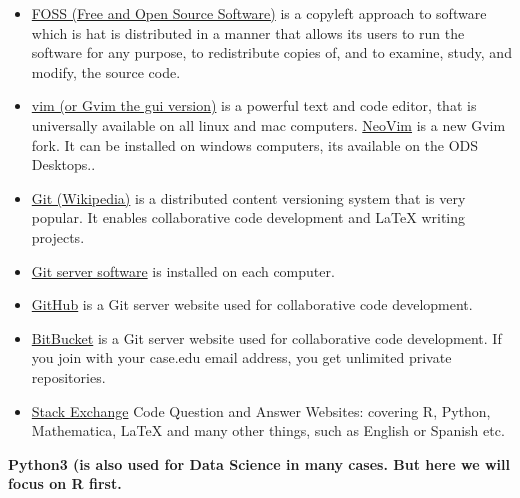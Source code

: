 \documentclass[10pt]{article} %
\begin{document}
      \begin{itemize}
        \item \href{"http://en.wikipedia.org/wiki/Portal:Free_software"}{FOSS (Free and Open Source Software)} is a copyleft approach to software which is hat is distributed in a manner that allows its users to run the software for any purpose, to redistribute copies of, and to examine, study, and modify, the source code. \cite{_portal:free_2014}
        \item \href{"http://www.vim.org/"}{vim (or Gvim the gui version)} is a powerful text and code editor, that is universally available on all linux and mac computers.\cite{_gvim_2014}   \href{"http://neovim.org/"}{NeoVim} is a new Gvim fork.\cite{_neovim_2014} It can be installed on windows computers, its available on the ODS Desktops.. \cite{_gvim_2014}
        \item \href{"http://en.wikipedia.org/wiki/Git_(software)"}{Git (Wikipedia)} is a distributed content versioning system that is very popular. It enables collaborative code development and LaTeX writing projects.\cite{_git_2014-2}
        \item \href{"http://git-scm.com/"}{Git server software} is installed on each computer.\cite{_git_2014}
        \item  \href{"https://github.com/"}{GitHub} is a Git server website used for collaborative code development.\cite{_github_2014}
        \item  \href{"https://bitbucket.org/"}{BitBucket} is a Git server website used for collaborative code development. If you join with your case.edu email address, you get unlimited private repositories.\cite{_bitbucket:_2014}
        \item \href{"http://stackexchange.com/tour"}{Stack Exchange}  \cite{stack_exchange_stack_2014} Code Question and Answer Websites: covering R, Python, Mathematica, {LaTeX} and many other things, such as English or Spanish etc.
      \end{itemize}

    {\bf Python3 (is also used for Data Science in many cases. But here we will focus on R first. }
\end{document}
